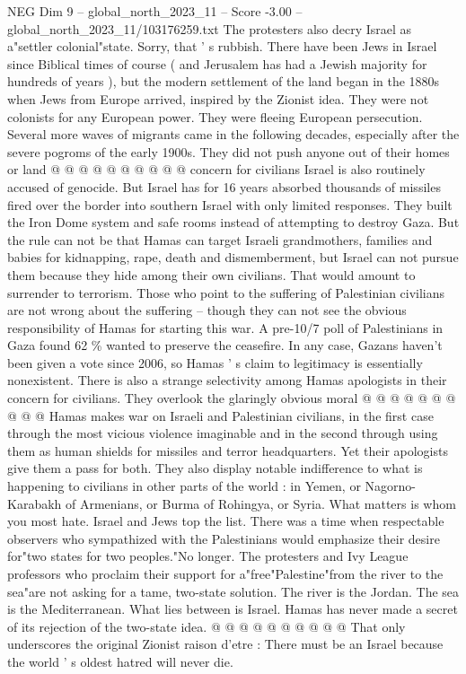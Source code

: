 \begin{textsample}{NEG Dim 9 – global\_north\_2023\_11 – Score -3.00 – global\_north\_2023\_11/103176259.txt}
The protesters also decry Israel as a"settler colonial"state.
Sorry, that ' s rubbish.
There have been Jews in Israel since Biblical times of course ( and Jerusalem has had a Jewish majority for hundreds of years ), but the modern settlement of the land began in the 1880s when Jews from Europe arrived, inspired by the Zionist idea.
They were not colonists for any European power.
They were fleeing European persecution.
Several more waves of migrants came in the following decades, especially after the severe pogroms of the early 1900s.
They did not push anyone out of their homes or land @ @ @ @ @ @ @ @ @ @ concern for civilians Israel is also routinely accused of genocide.
But Israel has for 16 years absorbed thousands of missiles fired over the border into southern Israel with only limited responses.
They built the Iron Dome system and safe rooms instead of attempting to destroy Gaza.
But the rule can not be that Hamas can target Israeli grandmothers, families and babies for kidnapping, rape, death and dismemberment, but Israel can not pursue them because they hide among their own civilians.
That would amount to surrender to terrorism.
Those who point to the suffering of Palestinian civilians are not wrong about the suffering -- though they can not see the obvious responsibility of Hamas for starting this war.
A pre-10/7 poll of Palestinians in Gaza found 62 \% wanted to preserve the ceasefire.
In any case, Gazans haven't been given a vote since 2006, so Hamas ' s claim to legitimacy is essentially nonexistent.
There is also a strange selectivity among Hamas apologists in their concern for civilians.
They overlook the glaringly obvious moral @ @ @ @ @ @ @ @ @ @ Hamas makes war on Israeli and Palestinian civilians, in the first case through the most vicious violence imaginable and in the second through using them as human shields for missiles and terror headquarters.
Yet their apologists give them a pass for both.
They also display notable indifference to what is happening to civilians in other parts of the world : in Yemen, or Nagorno-Karabakh of Armenians, or Burma of Rohingya, or Syria.
What matters is whom you most hate.
Israel and Jews top the list.
There was a time when respectable observers who sympathized with the Palestinians would emphasize their desire for"two states for two peoples."No longer.
The protesters and Ivy League professors who proclaim their support for a"free"Palestine"from the river to the sea"are not asking for a tame, two-state solution.
The river is the Jordan.
The sea is the Mediterranean.
What lies between is Israel.
Hamas has never made a secret of its rejection of the two-state idea. @ @ @ @ @ @ @ @ @ @ That only underscores the original Zionist raison d'etre : There must be an Israel because the world ' s oldest hatred will never die.

\end{textsample}

